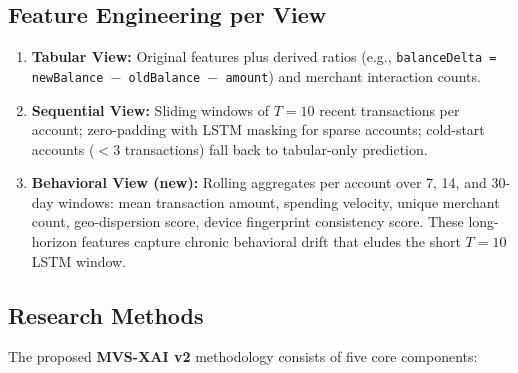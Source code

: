 \documentclass[10pt,a4paper,twocolumn]{article}
\begin{document}
\subsection{Feature Engineering per View}
\begin{enumerate}
    \item \textbf{Tabular View:} Original features plus derived ratios (e.g., \texttt{balanceDelta = newBalance $-$ oldBalance $-$ amount}) and merchant interaction counts.
    \item \textbf{Sequential View:} Sliding windows of $T{=}10$ recent transactions per account; zero-padding with LSTM masking for sparse accounts; cold-start accounts ($<3$ transactions) fall back to tabular-only prediction.
    \item \textbf{Behavioral View (new):} Rolling aggregates per account over 7, 14, and 30-day windows: mean transaction amount, spending velocity, unique merchant count, geo-dispersion score, device fingerprint consistency score. These long-horizon features capture chronic behavioral drift that eludes the short $T{=}10$ LSTM window.
\end{enumerate}

\subsection{Research Methods}\label{sec:methods}
The proposed \textbf{MVS-XAI v2} methodology consists of five core components:
\end{document}
